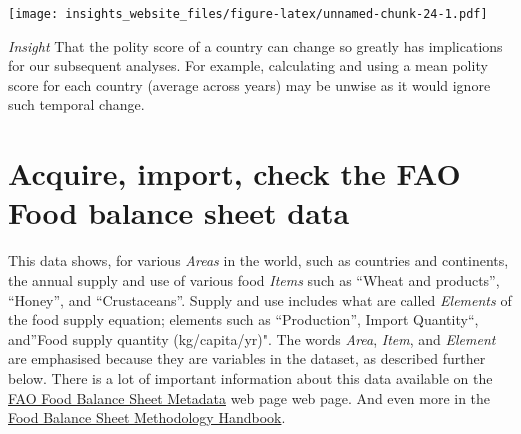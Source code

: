 \documentclass[]{book}
\newenvironment{Shaded}{\begin{snugshade}}{\end{snugshade}}
\newcommand{\DataTypeTok}[1]{\textcolor[rgb]{0.13,0.29,0.53}{#1}}
\newcommand{\KeywordTok}[1]{\textcolor[rgb]{0.13,0.29,0.53}{\textbf{#1}}}
\newcommand{\NormalTok}[1]{#1}
\newcommand{\OperatorTok}[1]{\textcolor[rgb]{0.81,0.36,0.00}{\textbf{#1}}}
\newcommand{\StringTok}[1]{\textcolor[rgb]{0.31,0.60,0.02}{#1}}
\begin{document}
\begin{Shaded}
\end{Shaded}

\texttt{[image: insights\_website\_files/figure-latex/unnamed-chunk-24-1.pdf]}

\emph{Insight} That the polity score of a country can change so greatly has implications for our subsequent analyses. For example, calculating and using a mean polity score for each country (average across years) may be unwise as it would ignore such temporal change.

\hypertarget{acquire-import-check-the-fao-food-balance-sheet-data}{%
\section{Acquire, import, check the FAO Food balance sheet data}\label{acquire-import-check-the-fao-food-balance-sheet-data}}

This data shows, for various \emph{Areas} in the world, such as countries and continents, the annual supply and use of various food \emph{Items} such as ``Wheat and products'', ``Honey'', and ``Crustaceans''. Supply and use includes what are called \emph{Elements} of the food supply equation; elements such as ``Production'', Import Quantity``, and''Food supply quantity (kg/capita/yr)". The words \emph{Area}, \emph{Item}, and \emph{Element} are emphasised because they are variables in the dataset, as described further below. There is a lot of important information about this data available on the \href{http://www.fao.org/faostat/en/\#data/FBS/metadata}{FAO Food Balance Sheet Metadata} web page web page. And even more in the \href{http://www.fao.org/economic/ess/fbs/ess-fbs02/en/}{Food Balance Sheet Methodology Handbook}.
\end{document}
